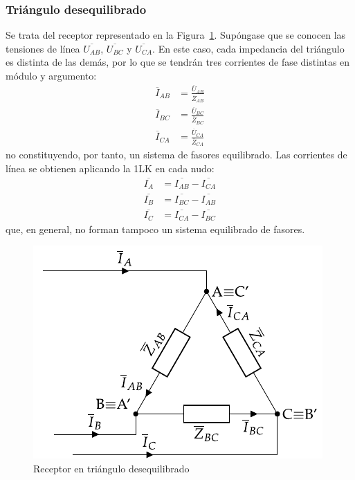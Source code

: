 \documentclass[11pt]{book} %
\begin{document}
	\subsubsection{Triángulo desequilibrado}
	Se trata del receptor representado en la Figura~\ref{fig.trianguloDesequilibrado_receptor}. Supóngase que se conocen las tensiones de línea $\overline{U_{AB}}$, $\overline{U_{BC}}$ y $\overline{U_{CA}}$. En este caso, cada impedancia del triángulo es distinta de las demás, por lo que se tendrán tres corrientes de fase distintas en módulo y argumento:
	\begin{align*}
      \overline{I}_{AB} &= \frac{\overline{U}_{AB}}{\overline{Z}_{AB}}\\
      \overline{I}_{BC} &= \frac{\overline{U}_{BC}}{\overline{Z}_{BC}}\\
      \overline{I}_{CA} &= \frac{\overline{U}_{CA}}{\overline{Z}_{CA}}
    \end{align*}
    no constituyendo, por tanto, un sistema de fasores equilibrado. Las corrientes de línea se obtienen aplicando la 1LK en cada nudo:
    \begin{align}
      \overline{I_A} &= \overline{I_{AB}} - \overline{I_{CA}} \\
      \overline{I_B} &= \overline{I_{BC}} - \overline{I_{AB}}\\
      \overline{I_C} &= \overline{I_{CA}} - \overline{I_{BC}}
    \end{align}
    que, en general, no forman tampoco un sistema equilibrado de fasores.
	
	\begin{figure}
	    \centering
	    \includegraphics{../figs/trianguloDesequilibrado_receptor.pdf}
	    \caption{Receptor en triángulo desequilibrado}
	    \label{fig.trianguloDesequilibrado_receptor}
	\end{figure}
	
\end{document}
